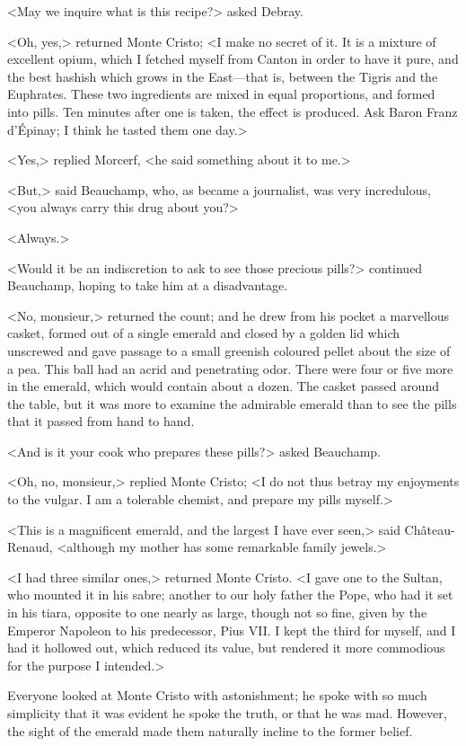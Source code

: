  <May we inquire what is this recipe?> asked Debray. 

 <Oh, yes,> returned Monte Cristo; <I make no secret of it. It is a mixture of excellent opium, which I fetched myself from Canton in order to have it pure, and the best hashish which grows in the East—that is, between the Tigris and the Euphrates. These two ingredients are mixed in equal proportions, and formed into pills. Ten minutes after one is taken, the effect is produced. Ask Baron Franz d'Épinay; I think he tasted them one day.> 

 <Yes,> replied Morcerf, <he said something about it to me.> 

 <But,> said Beauchamp, who, as became a journalist, was very incredulous, <you always carry this drug about you?> 

 <Always.> 

 <Would it be an indiscretion to ask to see those precious pills?> continued Beauchamp, hoping to take him at a disadvantage. 

 <No, monsieur,> returned the count; and he drew from his pocket a marvellous casket, formed out of a single emerald and closed by a golden lid which unscrewed and gave passage to a small greenish coloured pellet about the size of a pea. This ball had an acrid and penetrating odor. There were four or five more in the emerald, which would contain about a dozen. The casket passed around the table, but it was more to examine the admirable emerald than to see the pills that it passed from hand to hand. 

 <And is it your cook who prepares these pills?> asked Beauchamp. 

 <Oh, no, monsieur,> replied Monte Cristo; <I do not thus betray my enjoyments to the vulgar. I am a tolerable chemist, and prepare my pills myself.> 

 <This is a magnificent emerald, and the largest I have ever seen,> said Château-Renaud, <although my mother has some remarkable family jewels.> 

 <I had three similar ones,> returned Monte Cristo. <I gave one to the Sultan, who mounted it in his sabre; another to our holy father the Pope, who had it set in his tiara, opposite to one nearly as large, though not so fine, given by the Emperor Napoleon to his predecessor, Pius VII. I kept the third for myself, and I had it hollowed out, which reduced its value, but rendered it more commodious for the purpose I intended.> 

 Everyone looked at Monte Cristo with astonishment; he spoke with so much simplicity that it was evident he spoke the truth, or that he was mad. However, the sight of the emerald made them naturally incline to the former belief. 

